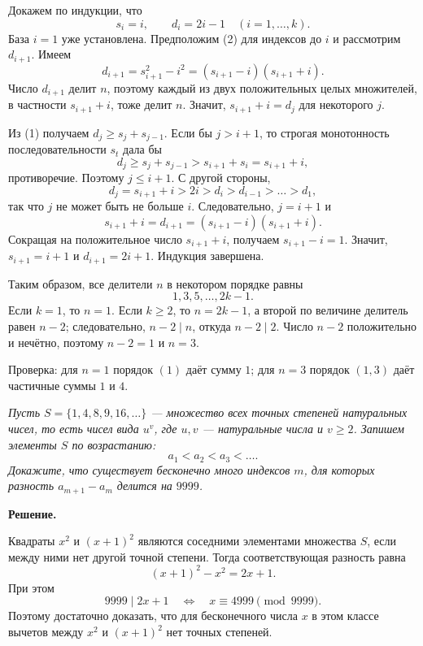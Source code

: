 Докажем по индукции, что
\[
 s_i=i,\qquad d_i=2i-1 \quad (i=1,\dots,k). \tag{2}
\]
База $i=1$ уже установлена. Предположим (2) для индексов до $i$ и рассмотрим $d_{i+1}$. Имеем
\[
 d_{i+1}=s_{i+1}^2-i^2=(s_{i+1}-i)(s_{i+1}+i).
\]
Число $d_{i+1}$ делит $n$, поэтому каждый из двух положительных целых множителей, в частности $s_{i+1}+i$, тоже делит $n$. Значит, $s_{i+1}+i=d_j$ для некоторого $j$.

Из (1) получаем $d_j\geq s_j+s_{j-1}$. Если бы $j>i+1$, то строгая монотонность последовательности $s_t$ дала бы
\[
 d_j\geq s_j+s_{j-1}>s_{i+1}+s_i=s_{i+1}+i,
\]
противоречие. Поэтому $j\leq i+1$. С другой стороны,
\[
 d_j=s_{i+1}+i>2i>d_i>d_{i-1}>\dots>d_1,
\]
так что $j$ не может быть не больше $i$. Следовательно, $j=i+1$ и
\[
 s_{i+1}+i=d_{i+1}=(s_{i+1}-i)(s_{i+1}+i).
\]
Сокращая на положительное число $s_{i+1}+i$, получаем $s_{i+1}-i=1$. Значит, $s_{i+1}=i+1$ и $d_{i+1}=2i+1$. Индукция завершена.

Таким образом, все делители $n$ в некотором порядке равны
\[
 1,3,5,\dots,2k-1.
\]
Если $k=1$, то $n=1$. Если $k\geq2$, то $n=2k-1$, а второй по величине делитель равен $n-2$; следовательно, $n-2\mid n$, откуда $n-2\mid2$. Число $n-2$ положительно и нечётно, поэтому $n-2=1$ и $n=3$.

Проверка: для $n=1$ порядок $(1)$ даёт сумму $1$; для $n=3$ порядок $(1,3)$ даёт частичные суммы $1$ и $4$.

\textit{Пусть $S=\{1,4,8,9,16,\dots\}$ --- множество всех точных степеней натуральных чисел, то есть чисел вида $u^v$, где $u,v$ --- натуральные числа и $v\geq2$. Запишем элементы $S$ по возрастанию:
\[
  a_1<a_2<a_3<\dots.
\]
Докажите, что существует бесконечно много индексов $m$, для которых разность $a_{m+1}-a_m$ делится на $9999$.}

\textbf{Решение.}


Квадраты $x^2$ и $(x+1)^2$ являются соседними элементами множества $S$, если между ними нет другой точной степени. Тогда соответствующая разность равна
\[
 (x+1)^2-x^2=2x+1.
\]
При этом
\[
 9999\mid 2x+1 \quad\Longleftrightarrow\quad x\equiv4999\pmod{9999}.
\]
Поэтому достаточно доказать, что для бесконечного числа $x$ в этом классе вычетов между $x^2$ и $(x+1)^2$ нет точных степеней.

